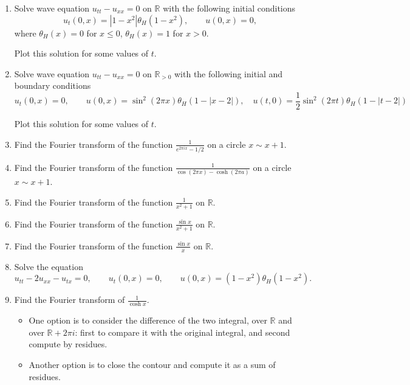 \documentclass[a4paper,11pt]{article}
\title{}
\author{}
\date{}
\begin{document}

\begin{enumerate}
\item\label{item:1} Solve wave equation \(u_{tt}-u_{xx}=0\) on \(\mathbb{R}\) with the following initial conditions \[u_t(0,x)=|1-x^2|\theta_H(1-x^2), \qquad u(0,x)=0,\] where \(\theta_H(x)=0\) for  \(x\le 0\), \(\theta_H(x)=1\) for \(x>0\).

Plot this solution for some values of \(t\).

\item\label{item:2} Solve wave equation \(u_{tt}-u_{xx}=0\) on \(\mathbb{R}_{>0}\) with the following initial and boundary conditions
\[u_t(0,x)=0,\qquad u(0,x)=\sin^2(2\pi x)\theta_H(1-|x-2|), \quad u(t,0)= \frac12\sin^2(2\pi t)\theta_H(1-|t-2|)\]

Plot this solution for some values of \(t\).

\item\label{item:3} Find the Fourier transform of the function \(\frac{1}{e^{2\pi i x}-1/2}\) on a circle \(x\sim x+1\).

\item\label{item:4} Find the Fourier transform of the function \(\frac{1}{\cos(2\pi x)-\cosh(2\pi a)}\) on a circle \(x\sim x+1\).

\item\label{item:5} Find the Fourier transform of the function \(\frac{1}{x^2+1}\) on \(\mathbb{R}\).

\item\label{item:6} Find the Fourier transform of the function \(\frac{\sin x}{x^2+1}\) on \(\mathbb{R}\).

\item\label{item:7} Find the Fourier transform of the function \(\frac{\sin x}{x}\) on \(\mathbb{R}\).

\item\label{item:8} Solve the equation
\[u_{tt}-2u_{xx}-u_{tx}=0, \qquad u_t(0,x)=0, \qquad u(0,x)=(1-x^2)\theta_H(1-x^2).\]

\item\label{item:9} Find the Fourier transform of \(\frac1{\cosh x}\).

\begin{itemize}
\item One option is to consider the difference of the two integral, over \(\mathbb{R}\) and over \(\mathbb{R}+2\pi i\): first to compare it with the original integral, and second compute by residues.
\item Another option is to close the contour and compute it as a sum of residues.
\end{itemize}


\end{enumerate}
\end{document}
